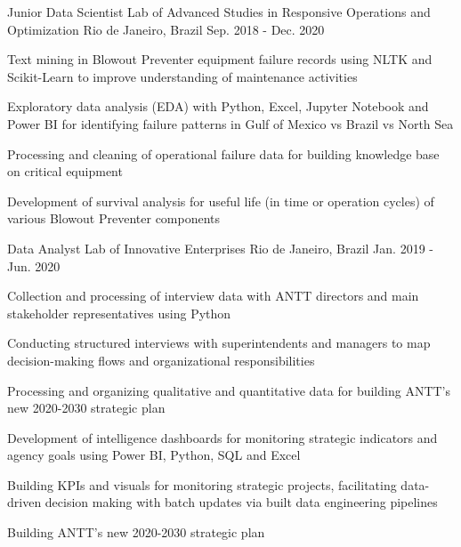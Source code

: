 \begin{cventries}
  \cventry
    {Junior Data Scientist} %
    {Lab of Advanced Studies in Responsive Operations and Optimization} %
    {Rio de Janeiro, Brazil} %
    {Sep. 2018 - Dec. 2020} %
    {
      \begin{cvitems} %
        \item {Text mining in Blowout Preventer equipment failure records using NLTK and Scikit-Learn to improve understanding of maintenance activities}
        \item {Exploratory data analysis (EDA) with Python, Excel, Jupyter Notebook and Power BI for identifying failure patterns in Gulf of Mexico vs Brazil vs North Sea}
        \item {Processing and cleaning of operational failure data for building knowledge base on critical equipment}
        \item {Development of survival analysis for useful life (in time or operation cycles) of various Blowout Preventer components}
      \end{cvitems}
    }

  \cventry
    {Data Analyst} %
    {Lab of Innovative Enterprises} %
    {Rio de Janeiro, Brazil} %
    {Jan. 2019 - Jun. 2020} %
    {
      \begin{cvitems} %
        \item {Collection and processing of interview data with ANTT directors and main stakeholder representatives using Python}
        \item {Conducting structured interviews with superintendents and managers to map decision-making flows and organizational responsibilities}
        \item {Processing and organizing qualitative and quantitative data for building ANTT's new 2020-2030 strategic plan}
        \item {Development of intelligence dashboards for monitoring strategic indicators and agency goals using Power BI, Python, SQL and Excel}
        \item {Building KPIs and visuals for monitoring strategic projects, facilitating data-driven decision making with batch updates via built data engineering pipelines}
        \item {Building ANTT's new 2020-2030 strategic plan}
      \end{cvitems}
    }


\end{cventries}
